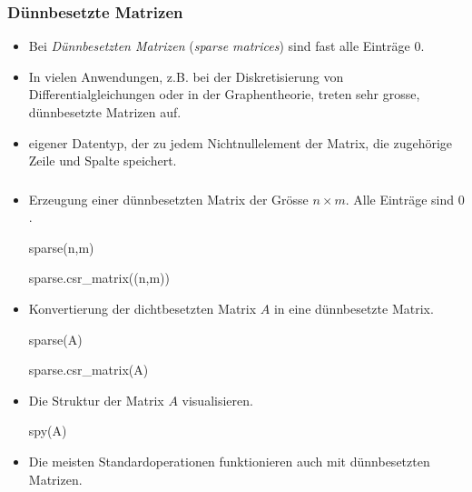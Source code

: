 \documentclass[hyperref={xetex}]{beamer}
\begin{document}
% 
%
\begin{frame}[fragile]\frametitle{D\"unnbesetzte Matrizen}
\begin{itemize}
\item Bei {\it D\"unnbesetzten Matrizen} ({\it sparse matrices}) sind
  fast alle Eintr\"age $0$.
\item In vielen Anwendungen, z.B. bei der Diskretisierung von
  Differentialgleichungen oder in der Graphentheorie, treten sehr
  grosse, d\"unnbesetzte  Matrizen auf.
\item eigener Datentyp, der zu
  jedem Nichtnullelement der Matrix, die zugeh\"orige Zeile und Spalte
  speichert.    
\end{itemize}
\end{frame}
% 
%
\begin{frame}[fragile]\frametitle{}
\begin{itemize}
\item Erzeugung einer d\"unnbesetzten Matrix
  der Gr\"osse $n \times m$. Alle Eintr\"age sind $0$.
\begin{matlabin}
sparse(n,m) 
\end{matlabin}
\begin{pyin}
sparse.csr_matrix((n,m))
\end{pyin}

\item Konvertierung der dichtbesetzten Matrix
  $A$ in eine d\"unnbesetzte Matrix.
\begin{matlabin}
sparse(A)
\end{matlabin}
\begin{pyin}
sparse.csr_matrix(A)
\end{pyin}

\item Die Struktur der Matrix $A$ visualisieren.
\begin{matlabin}
spy(A)
\end{matlabin}

\item Die meisten Standardoperationen funktionieren auch mit
  d\"unnbesetzten Matrizen.  
\end{itemize}
\end{frame}
% 
%
\end{document}
